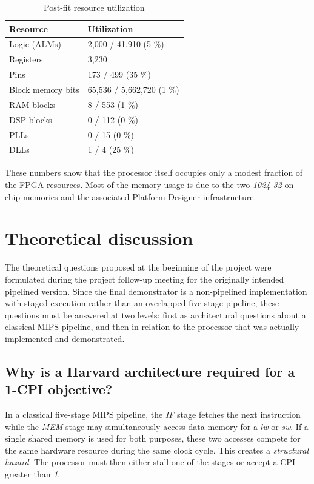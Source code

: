 \documentclass[a4paper,11pt]{scrartcl}
\begin{document}
\begin{table}[htbp]
\caption{\label{tab:resources}Post-fit resource utilization}
\centering
\begin{tabular}{ll}
\hline
Resource & Utilization\\
\hline
Logic (ALMs) & 2,000 / 41,910 (5 \%)\\
Registers & 3,230\\
Pins & 173 / 499 (35 \%)\\
Block memory bits & 65,536 / 5,662,720 (1 \%)\\
RAM blocks & 8 / 553 (1 \%)\\
DSP blocks & 0 / 112 (0 \%)\\
PLLs & 0 / 15 (0 \%)\\
DLLs & 1 / 4 (25 \%)\\
\hline
\end{tabular}
\end{table}

These numbers show that the processor itself occupies only a modest fraction of the FPGA resources. Most of the memory usage is due to the two \emph{1024 \texttimes{} 32} on-chip memories and the associated Platform Designer infrastructure.
\section{Theoretical discussion}
\label{sec:org17ff85d}

The theoretical questions proposed at the beginning of the project were formulated during the project follow-up meeting for the originally intended pipelined version. Since the final demonstrator is a non-pipelined implementation with staged execution rather than an overlapped five-stage pipeline, these questions must be answered at two levels: first as architectural questions about a classical MIPS pipeline, and then in relation to the processor that was actually implemented and demonstrated.
\subsection{Why is a Harvard architecture required for a 1-CPI objective?}
\label{sec:org649798a}

In a classical five-stage MIPS pipeline, the \emph{IF} stage fetches the next instruction while the \emph{MEM} stage may simultaneously access data memory for a \emph{lw} or \emph{sw}. If a single shared memory is used for both purposes, these two accesses compete for the same hardware resource during the same clock cycle. This creates a \emph{structural hazard}. The processor must then either stall one of the stages or accept a CPI greater than \emph{1}.
\end{document}
